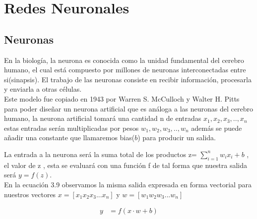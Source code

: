 \section{Redes Neuronales}
\subsection{Neuronas}
En la biología, la neurona es conocida como la unidad fundamental del cerebro humano, el cual está compuesto por millones de neuronas interconectadas entre si(sinapsis). El trabajo de las neuronas consiste en recibir información, procesarla y enviarla a otras células.\\ Este modelo fue copiado en 1943 por Warren S. McCulloch y Walter H. Pitts para poder diseñar un neurona artificial que es análoga a las neuronas del cerebro humano, la neurona artificial tomará una cantidad n de entradas $x_{1}, x_{2}, x_{3}, .. , x_{n}$ estas entradas serán multiplicadas por pesos $w_{1}, w_{2}, w_{3}, .. , w_{n}$ además se puede añadir una constante que llamaremos bias($b$) para producir un salida.

La entrada a la neurona será la suma total de los productos z=  $\sum_{i=1}^{n}{ w_{i}x_{i}}+b$ , el valor de z , esta se evaluará con una función f de tal forma que nuestra salida será $y=f(z)$.\\ En la ecuación 3.9 observamos la misma salida expresada en forma vectorial para nuestros vectores  $x = [x_{1}  x_{2}  x_{3}  ...  x_{n}]$ y $w = [w_{1}  w_{2}  w_{3}  ...  w_{n}]$



\begin{equation}
\label{forma vectorial}
\begin{aligned}
y&=f(x\cdot w+b)
\end{aligned}
\end{equation}

